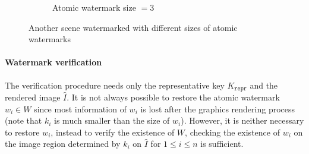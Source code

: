 \begin{figure}[ht]
{\begin{subfigure}[t]{0.4\textwidth}
        \label{subfig:tea_mug_wm_ok}
        \caption{Atomic watermark size $= 3$}
    \end{subfigure}}
    \caption[Scene watermarked with different sizes of atomic watermarks]{Another scene watermarked with different sizes of atomic watermarks}
    \label{fig:tea_mug}
\end{figure}

\paragraph[Watermark verification]{Watermark verification}
The verification procedure needs only the representative key $K_\mathtt{repr}$ and the rendered image $\hat{I}$. It is not always possible to restore the atomic watermark $w_i \in W$ since most information of $w_i$ is lost after the graphics rendering process (note that $k_i$ is much smaller than the size of $w_i$). However, it is neither necessary to restore $w_i$, instead to verify the existence of $W$, checking the existence of $w_i$ on the image region determined by $k_i$ on $\hat{I}$ for $1 \leq i \leq n$ is sufficient.

